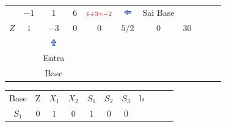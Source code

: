\begin{frame}
{\begin{table}
\begin{tabular}{c c c c c c c c c c c}
				& \cellcolor{gray!50} $\scriptstyle -1$
				& \cellcolor{gray!50} $\scriptstyle 1$
				& \cellcolor{gray!50} $\scriptstyle 6$
				& $\scriptstyle  \color{red} 6 \div 3 = +2$
				& \includegraphics[width=0.3cm,height=0.3cm]{setaesquerda.jpg}
				& \scriptsize \color{red} Sai Base\\
				\cline{1-8}
				\cellcolor{blue!100} \color{white} $\scriptstyle Z$
				& \cellcolor{yellow!50} $\scriptstyle 1$
				& \cellcolor{gray!50} $\scriptstyle -3$
				& \cellcolor{yellow!50} $\scriptstyle 0$
				& \cellcolor{yellow!50} $\scriptstyle 0$
				& \cellcolor{yellow!50} $\scriptstyle 5/2$
				& \cellcolor{yellow!50} $\scriptstyle 0$
				& \cellcolor{gray!50} $\scriptstyle 30$ 
				&
				&
				& \\
				\cline{1-8}
				& 
				& \includegraphics[width=0.3cm,height=0.3cm]{setacima.jpg}
				& 
				& 
				& 
				& 
				&  
				&
				&
				& \\ 
				& 
				& \scriptsize \color{red} Entra
				&  
				& 
				& 
				& 
				&  
				&
				&
				& \\
				& 
				& \scriptsize \color{red} Base
				&  
				& 
				& 
				& 
				&  
				&
				&
				& \\
			\end{tabular}
		\end{table}			
	}	
	{		
		\begin{table}		
			\begin{tabular}{c c c c c c c c c c c}
				\cline{1-8} 
				\cellcolor{blue!100} \color{white} \scriptsize Base 
				&\cellcolor{blue!100} \color{white} \scriptsize Z 
				&\cellcolor{blue!100} \color{red} $\scriptstyle X_1$ 
				&\cellcolor{blue!100} \color{red} $\scriptstyle X_2$ 
				&\cellcolor{blue!100} \color{red} $\scriptstyle S_1$ 
				&\cellcolor{blue!100} \color{white} $\scriptstyle S_2$ 
				&\cellcolor{blue!100} \color{white} $\scriptstyle S_3$ 
				&\cellcolor{blue!100} \color{white} \scriptsize b
				&
				&
				& \\
				\cline{1-8}
				\cellcolor{blue!100} \color{red} $\scriptstyle S_1$
				& \cellcolor{yellow!50} $\scriptstyle 0$
				& \cellcolor{gray!50} $\scriptstyle 1$
				& \cellcolor{yellow!50} $\scriptstyle 0$
				& \cellcolor{yellow!50} $\scriptstyle 1$
				& \cellcolor{yellow!50} $\scriptstyle 0$
				& \cellcolor{yellow!50} $\scriptstyle 0$

\end{tabular}
\end{table}}
\end{frame}
